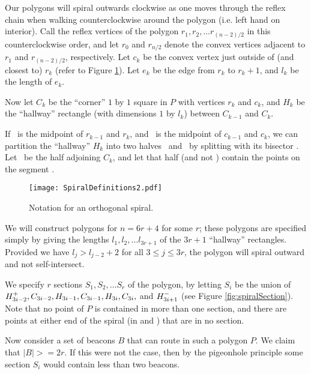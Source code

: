 \documentclass{article}
\begin{document}
	Our polygons will spiral outwards clockwise as one moves through the reflex
	chain when walking counterclockwise around the polygon (i.e. left hand on
	interior).
	Call the reflex vertices of the polygon $r_1, r_2, \ldots r_{(n-2)/2}$ in
	this counterclockwise order, and let $r_0$ and $r_{n/2}$ denote the convex
	vertices adjacent to $r_1$ and $r_{(n-2)/2}$, respectively.
	Let $c_k$ be the convex vertex just outside of (and closest to) $r_k$
	(refer to Figure \ref{fig:spiralDefinitions}).
	Let $e_k$ be the edge from $r_k$ to $r_k+1$, and $l_k$ be the length of $e_k$.
	

	Now let $C_k$ be the ``corner'' $1$ by $1$ square in $P$ with vertices $r_k$ and
	$c_k$, and $H_k$ be the ``hallway'' rectangle (with dimensions $1$ by $l_k$)
	between $C_{k-1}$ and $C_{k}$.
	
	
	If \mkin\  is the midpoint of $r_{k-1}$ and $r_k$,
	and \mkout\  is the midpoint of $c_{k-1}$ and $c_k$,
	we can partition the ``hallway'' $H_k$ into two halves \ and \ 
	by splitting with its bisector \mkin\mkout.
	Let \Hp{k}\ be the half adjoining $C_k$, and
	let that half (and not ) contain the points on the segment
	\mkin\mkout.

\begin{figure}[htb]
	\begin{center}
		\texttt{[image: SpiralDefinitions2.pdf]}
	\end{center}
	\caption{ Notation for an orthogonal spiral. }
	\label{fig:spiralDefinitions}
\end{figure}

We will construct polygons for $n = 6r + 4$ for some $r$; these polygons
are specified simply by giving the lengths $l_1, l_2, \ldots l_{3r+1}$ 
of the $3r+1$ ``hallway'' rectangles.
Provided we have $l_j > l_{j-2} + 2$ for all $3 \leq j \leq 3r$, the polygon
will spiral outward and not self-intersect.

We specify $r$ sections $S_1, S_2, \ldots S_r$ of the polygon, by letting
$S_i$ be the union of $H^{+}_{3i-2}, C_{3i-2}, H_{3i-1}, C_{3i-1}, H_{3i},
C_{3i},$ and $H^{-}_{3i+1}$ (see Figure \ref{fig:spiralSection}).
Note that no point of $P$ is contained in more than one section, and there
are points at either end of the spiral (in \Hm{1} and \Hp{3r+1})
that are in no section.

Now consider a set of beacons $B$ that can route in such a polygon $P$.
We claim that $|B| >= 2r$.
If this were not the case, then by the pigeonhole principle some section $S_i$
would contain less than two beacons.
\end{document}
